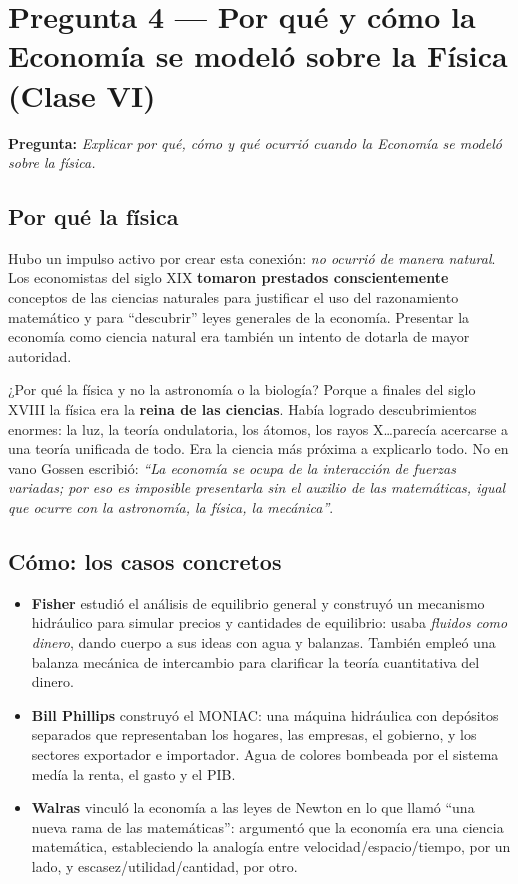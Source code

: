 \documentclass[a4paper,12pt]{article}
\begin{document}
\vspace{1.5em}

\section{Pregunta 4 — Por qué y cómo la Economía se modeló sobre la Física (Clase VI)}

\textbf{Pregunta:} \textit{Explicar por qué, cómo y qué ocurrió cuando la Economía se modeló sobre la física.}

\subsection*{Por qué la física}

Hubo un impulso activo por crear esta conexión: \textit{no ocurrió de manera natural}. Los economistas del siglo XIX \textbf{tomaron prestados conscientemente} conceptos de las ciencias naturales para justificar el uso del razonamiento matemático y para ``descubrir'' leyes generales de la economía. Presentar la economía como ciencia natural era también un intento de dotarla de mayor autoridad.

¿Por qué la física y no la astronomía o la biología? Porque a finales del siglo XVIII la física era la \textbf{reina de las ciencias}. Había logrado descubrimientos enormes: la luz, la teoría ondulatoria, los átomos, los rayos X\ldots parecía acercarse a una teoría unificada de todo. Era la ciencia más próxima a explicarlo todo. No en vano Gossen escribió: \textit{``La economía se ocupa de la interacción de fuerzas variadas; por eso es imposible presentarla sin el auxilio de las matemáticas, igual que ocurre con la astronomía, la física, la mecánica''}.

\subsection*{Cómo: los casos concretos}

\begin{itemize}
  \item \textbf{Fisher} estudió el análisis de equilibrio general y construyó un mecanismo hidráulico para simular precios y cantidades de equilibrio: usaba \textit{fluidos como dinero}, dando cuerpo a sus ideas con agua y balanzas. También empleó una balanza mecánica de intercambio para clarificar la teoría cuantitativa del dinero.

  \item \textbf{Bill Phillips} construyó el MONIAC: una máquina hidráulica con depósitos separados que representaban los hogares, las empresas, el gobierno, y los sectores exportador e importador. Agua de colores bombeada por el sistema medía la renta, el gasto y el PIB.

  \item \textbf{Walras} vinculó la economía a las leyes de Newton en lo que llamó ``una nueva rama de las matemáticas'': argumentó que la economía era una ciencia matemática, estableciendo la analogía entre velocidad/espacio/tiempo, por un lado, y escasez/utilidad/cantidad, por otro.
\end{itemize}
\end{document}
